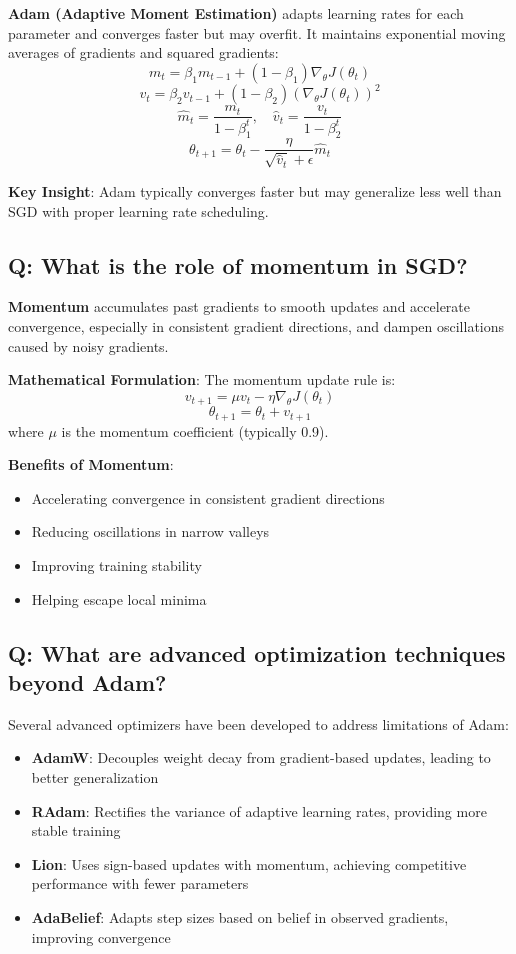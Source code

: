 \textbf{Adam (Adaptive Moment Estimation)} adapts learning rates for each parameter and converges faster but may overfit. It maintains exponential moving averages of gradients and squared gradients:
\[
	m_t = \beta_1 m_{t-1} + (1-\beta_1) \nabla_\theta J(\theta_t)
\]
\[
	v_t = \beta_2 v_{t-1} + (1-\beta_2) (\nabla_\theta J(\theta_t))^2
\]
\[
	\hat{m}_t = \frac{m_t}{1-\beta_1^t}, \quad \hat{v}_t = \frac{v_t}{1-\beta_2^t}
\]
\[
	\theta_{t+1} = \theta_t - \frac{\eta}{\sqrt{\hat{v}_t} + \epsilon} \hat{m}_t
\]

\textbf{Key Insight}: Adam typically converges faster but may generalize less well than SGD with proper learning rate scheduling.

\subsection*{\textcolor{primaryteal}{Q: What is the role of momentum in SGD?}}
\textbf{Momentum} accumulates past gradients to smooth updates and accelerate convergence, especially in consistent gradient directions, and dampen oscillations caused by noisy gradients.

\textbf{Mathematical Formulation}: The momentum update rule is:
\[
	v_{t+1} = \mu v_t - \eta \nabla_\theta J(\theta_t)
\]
\[
	\theta_{t+1} = \theta_t + v_{t+1}
\]
where $\mu$ is the momentum coefficient (typically 0.9).

\textbf{Benefits of Momentum}:
\begin{itemize}
	\item Accelerating convergence in consistent gradient directions
	\item Reducing oscillations in narrow valleys
	\item Improving training stability
	\item Helping escape local minima
\end{itemize}

\subsection*{\textcolor{primaryteal}{Q: What are advanced optimization techniques beyond Adam?}}
Several advanced optimizers have been developed to address limitations of Adam:

\begin{itemize}
	\item \textbf{AdamW}: Decouples weight decay from gradient-based updates, leading to better generalization
	\item \textbf{RAdam}: Rectifies the variance of adaptive learning rates, providing more stable training
	\item \textbf{Lion}: Uses sign-based updates with momentum, achieving competitive performance with fewer parameters
	\item \textbf{AdaBelief}: Adapts step sizes based on belief in observed gradients, improving convergence
\end{itemize}

